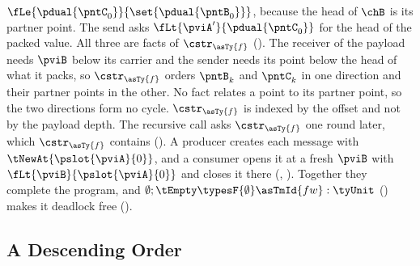 \begin{example}
  $\fLe{\pdual{\pntC_0}}{\set{\pdual{\pntB_0}}}$, because the head of
  $\chB$ is its partner point. The send asks
  $\fLt{\pviA'}{\pdual{\pntC_0}}$ for the head of the packed value. All
  three are facts of $\cstr_{\asTy{f}}$ (). The receiver of the
  payload needs $\pviB$ below its carrier and the sender needs its point
  below the head of what it packs, so $\cstr_{\asTy{f}}$ orders $\pntB_k$
  and $\pntC_k$ in one direction and their partner points in the other.
  No fact relates a point to its partner point, so the two directions
  form no cycle. $\cstr_{\asTy{f}}$ is indexed by the offset and not by
  the payload depth. The recursive call asks $\cstr_{\asTy{f}}$ one round
  later, which $\cstr_{\asTy{f}}$ contains (). A producer
  creates each message with $\tNewAt{\pslot{\pviA}{0}}$, and a consumer
  opens it at a fresh $\pviB$ with $\fLt{\pviB}{\pslot{\pviA}{0}}$ and
  closes it there (, ). Together
  they complete the program, and
  $\emptyset ; \tEmpty \typesF{\emptyset} \asTmId{fw} : \tyUnit$
  () makes it deadlock free
  ().
\end{example}

\subsection{A Descending Order}
\label{sec:ex-descending}

